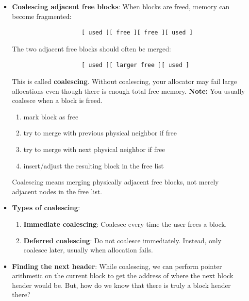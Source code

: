 \documentclass{report}
\begin{document}
\begin{itemize}
\begin{verbatim}
                    [ used 100 ][ free 900-ish ]
                \end{verbatim}
                You need to understand how to split one block into two valid blocks with separate headers.
            \item \textbf{Coalescing adjacent free blocks}: When blocks are freed, memory can become fragmented:
                \begin{verbatim}
                    [ used ][ free ][ free ][ used ]
                \end{verbatim}
                The two adjacent free blocks should often be merged:
                \begin{verbatim}
                    [ used ][ larger free ][ used ]
                \end{verbatim}
                This is called \textbf{coalescing}.
                \bigbreak \noindent 
                Without coalescing, your allocator may fail large allocations even though there is enough total free memory.
                \bigbreak \noindent 
                \textbf{Note:} You usually coalesce when a block is freed.
                \begin{enumerate}
                    \item mark block as free
                    \item try to merge with previous physical neighbor if free
                    \item try to merge with next physical neighbor if free
                    \item insert/adjust the resulting block in the free list
                \end{enumerate}
                Coalescing means merging physically adjacent free blocks, not merely adjacent nodes in the free list.
            \item \textbf{Types of coalescing}: 
                \begin{enumerate}
                    \item \textbf{Immediate coalescing}: Coalesce every time the user frees a block.
                    \item \textbf{Deferred coalescing}: Do not coalesce immediately. Instead, only coalesce later, usually when allocation fails.
                \end{enumerate}
            \item \textbf{Finding the next header}: While coalescing, we can perform pointer arithmetic on the current block to get the address of where the next block header would be. But, how do we know that there is truly a block header there?

\end{itemize}
\end{document}
